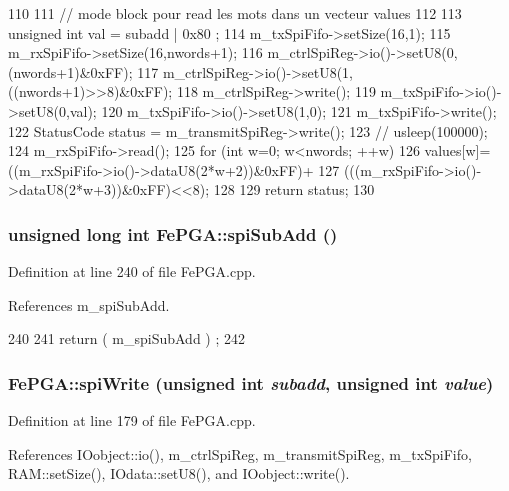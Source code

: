\begin{DoxyCode}
110                                                                                  
              { 
111   // mode block pour read les mots dans un vecteur values
112 
113   unsigned int val = subadd | 0x80 ; 
114   m_txSpiFifo->setSize(16,1);
115   m_rxSpiFifo->setSize(16,nwords+1);
116   m_ctrlSpiReg->io()->setU8(0,(nwords+1)&0xFF);
117   m_ctrlSpiReg->io()->setU8(1,((nwords+1)>>8)&0xFF);
118   m_ctrlSpiReg->write();
119   m_txSpiFifo->io()->setU8(0,val);
120   m_txSpiFifo->io()->setU8(1,0);
121   m_txSpiFifo->write();
122   StatusCode status = m_transmitSpiReg->write();  
123   //  usleep(100000);
124   m_rxSpiFifo->read();
125   for (int w=0; w<nwords; ++w) {
126     values[w]=((m_rxSpiFifo->io()->dataU8(2*w+2))&0xFF)+
127       (((m_rxSpiFifo->io()->dataU8(2*w+3))&0xFF)<<8);
128   }
129   return status;
130 }
\end{DoxyCode}
\hypertarget{classFePGA_a6637adb1cd981cf398ea9f1c3feafe83}{
\subsubsection[{spiSubAdd}]{\setlength{\rightskip}{0pt plus 5cm}unsigned long int FePGA::spiSubAdd ()}}
\label{classFePGA_a6637adb1cd981cf398ea9f1c3feafe83}


Definition at line 240 of file FePGA.cpp.

References m\_\-spiSubAdd.


\begin{DoxyCode}
240                                   {
241   return ( m_spiSubAdd ) ;
242 }
\end{DoxyCode}
\hypertarget{classFePGA_ab41df6b1d6a147fbf5611e54058f902d}{
\subsubsection[{spiWrite}]{ FePGA::spiWrite (unsigned int {\em subadd}, \/  unsigned int {\em value})}}
\label{classFePGA_ab41df6b1d6a147fbf5611e54058f902d}


Definition at line 179 of file FePGA.cpp.

References IOobject::io(), m\_\-ctrlSpiReg, m\_\-transmitSpiReg, m\_\-txSpiFifo, RAM::setSize(), IOdata::setU8(), and IOobject::write().



